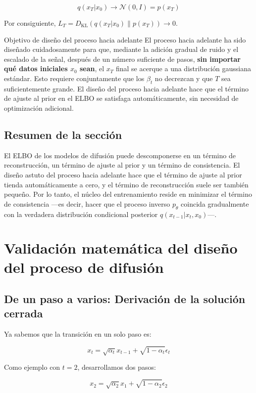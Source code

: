 \documentclass[a4paper]{article}
\begin{document}
$$q(x_T | x_0) \to \mathcal{N}(0, I) = p(x_T)$$

Por consiguiente, $L_T = D_{\text{KL}}(q(x_T|x_0) \| p(x_T)) \to 0$.

\begin{importantbox}{Objetivo de diseño del proceso hacia adelante}
El proceso hacia adelante ha sido diseñado cuidadosamente para que, mediante la adición gradual de ruido y el escalado de la señal, después de un número suficiente de pasos, \textbf{sin importar qué datos iniciales $x_0$ sean}, el $x_T$ final se acerque a una distribución gaussiana estándar. Esto requiere conjuntamente que los $\beta_t$ no decrezcan y que $T$ sea suficientemente grande. El diseño del proceso hacia adelante hace que el término de ajuste al prior en el ELBO se satisfaga automáticamente, sin necesidad de optimización adicional.
\end{importantbox}

\subsection{Resumen de la sección}

El ELBO de los modelos de difusión puede descomponerse en un término de reconstrucción, un término de ajuste al prior y un término de consistencia. El diseño astuto del proceso hacia adelante hace que el término de ajuste al prior tienda automáticamente a cero, y el término de reconstrucción suele ser también pequeño. Por lo tanto, el núcleo del entrenamiento reside en minimizar el término de consistencia —es decir, hacer que el proceso inverso $p_\theta$ coincida gradualmente con la verdadera distribución condicional posterior $q(x_{t-1}|x_t, x_0)$—.
\section{Validación matemática del diseño del proceso de difusión}

\subsection{De un paso a varios: Derivación de la solución cerrada}

Ya sabemos que la transición en un solo paso es:

$$x_t = \sqrt{\alpha_t} x_{t-1} + \sqrt{1 - \alpha_t} \epsilon_t$$

Como ejemplo con $t=2$, desarrollamos dos pasos:

$$x_2 = \sqrt{\alpha_2} x_1 + \sqrt{1-\alpha_2} \epsilon_2$$
\end{document}
